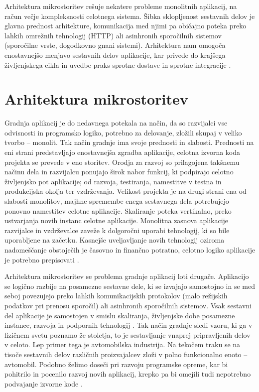 \documentclass[a4paper, 12pt]{book}
\begin{document}
Arhitektura mikrostoritev rešuje nekatere probleme monolitnih aplikacij, na račun večje kompleksnosti celotnega sistema.
Šibka sklopljenost sestavnih delov je glavna prednost arhitekture, komunikacija med njimi pa običajno poteka preko lahkih omrežnih tehnologij (HTTP) ali asinhronih sporočilnih sistemov (sporočilne vrste, dogodkovno gnani sistemi).
Arhitektura nam omogoča enostavnejšo menjavo sestavnih delov aplikacije, kar privede do krajšega življenjskega cikla in uvedbe praks sprotne dostave in sprotne integracije \cite{monolithMicroservice}.


\section{Arhitektura mikrostoritev}

Gradnja aplikacij je do nedavnega potekala na način, da so razvijalci vse odvisnosti in programsko logiko, potrebno za delovanje, zložili skupaj v veliko tvorbo -- monolit.
Tak način gradnje ima svoje prednosti in slabosti.
Prednosti na eni strani predstavljajo enostavnejša zgradba aplikacije, celotna izvorna koda projekta se prevede v eno storitev.
Orodja za razvoj so prilagojena takšnemu načinu dela in razvijalcu ponujajo širok nabor funkcij, ki podpirajo celotno življenjsko pot aplikacije; od razvoja, testiranja, namestitve v testna in produkcijska okolja ter vzdrževanja.
Velikost projekta je na drugi strani ena od slabosti monolitov, majhne spremembe enega sestavnega dela potrebujejo ponovno namestitev celotne aplikacije.
Skaliranje poteka vertikalno, preko ustvarjanja novih instanc celotne aplikacije.
Monolitna zasnova aplikacije razvijalce in vzdrževalce zaveže k dolgoročni uporabi tehnologij, ki so bile uporabljene na začetku.
Kasnejše uveljavljanje novih tehnologij oziroma nadomeščanje obstoječih je časovno in finančno potratno, celotno logiko aplikacije je potrebno prepisovati \cite{monolithMicroservice}.

Arhitektura mikrostoritev se problema gradnje aplikacij loti drugače.
Aplikacijo se logično razbije na posamezne sestavne dele, ki se izvajajo samostojno in se med seboj povezujejo preko lahkih komunikacijskih protokolov (malo režijskih podatkov pri prenosu sporočil) ali asinhronih sporočilnih sistemov.
Vsak sestavni del aplikacije je samostojen v smislu skaliranja, življenjske dobe posamezne instance, razvoja in podpornih tehnologij \cite{7030212}.
Tak način gradnje sledi vzoru, ki ga v fizičnem svetu poznamo že stoletja, to je sestavljanje vnaprej pripravljenih delov v celoto.
Lep primer tega je avtomobilska industrija.
Na tekočem traku se na tisoče sestavnih delov različnih proizvajalcev zloži v polno funkcionalno enoto -- avtomobil.
Podobno želimo doseči pri razvoju programske opreme, kar bi pohitrilo in pocenilo razvoj novih aplikacij, krepko pa bi omejili tudi nepotrebno podvajanje izvorne kode \cite{microservicePattern, microservicesMartin}.
\end{document}
